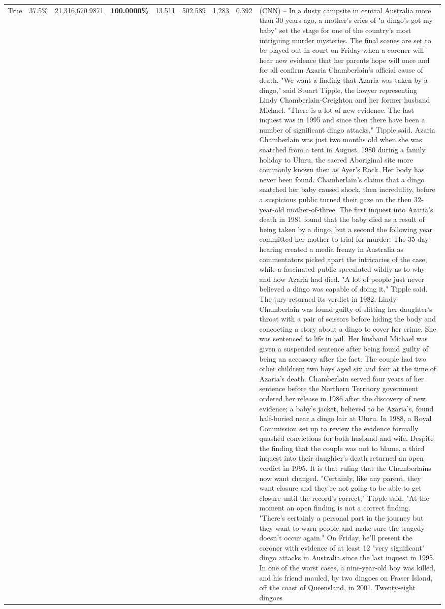 \begin{table}[H]
\begin{tabular}{lllrlllll}
True & 37.5\% & 21,316,670.9871 & \bfseries \color{red} 100.0000\% & 13.511 & 502.589 & 1,283 & 0.392 & (CNN) -- In a dusty campsite in central Australia more than 30 years ago, a mother's cries of "a dingo's got my baby" set the stage for one of the country's most intriguing murder mysteries. The final scenes are set to be played out in court on Friday when a coroner will hear new evidence that her parents hope will once and for all confirm Azaria Chamberlain's official cause of death. "We want a finding that Azaria was taken by a dingo," said Stuart Tipple, the lawyer representing Lindy Chamberlain-Creighton and her former husband Michael. "There is a lot of new evidence. The last inquest was in 1995 and since then there have been a number of significant dingo attacks," Tipple said. Azaria Chamberlain was just two months old when she was snatched from a tent in August, 1980 during a family holiday to Uluru, the sacred Aboriginal site more commonly known then as Ayer's Rock. Her body has never been found. Chamberlain's claims that a dingo snatched her baby caused shock, then incredulity, before a suspicious public turned their gaze on the then 32-year-old mother-of-three. The first inquest into Azaria's death in 1981 found that the baby died as a result of being taken by a dingo, but a second the following year committed her mother to trial for murder. The 35-day hearing created a media frenzy in Australia as commentators picked apart the intricacies of the case, while a fascinated public speculated wildly as to why and how Azaria had died. "A lot of people just never believed a dingo was capable of doing it," Tipple said. The jury returned its verdict in 1982; Lindy Chamberlain was found guilty of slitting her daughter's throat with a pair of scissors before hiding the body and concocting a story about a dingo to cover her crime. She was sentenced to life in jail. Her husband Michael was given a suspended sentence after being found guilty of being an accessory after the fact. The couple had two other children; two boys aged six and four at the time of Azaria's death. Chamberlain served four years of her sentence before the Northern Territory government ordered her release in 1986 after the discovery of new evidence; a baby's jacket, believed to be Azaria's, found half-buried near a dingo lair at Uluru. In 1988, a Royal Commission set up to review the evidence formally quashed convictions for both husband and wife. Despite the finding that the couple was not to blame, a third inquest into their daughter's death returned an open verdict in 1995. It is that ruling that the Chamberlains now want changed. "Certainly, like any parent, they want closure and they're not going to be able to get closure until the record's correct," Tipple said. "At the moment an open finding is not a correct finding. "There's certainly a personal part in the journey but they want to warn people and make sure the tragedy doesn't occur again." On Friday, he'll present the coroner with evidence of at least 12 "very significant" dingo attacks in Australia since the last inquest in 1995. In one of the worst cases, a nine-year-old boy was killed, and his friend mauled, by two dingoes on Fraser Island, off the coast of Queensland, in 2001. Twenty-eight dingoes 
\end{tabular}
\end{table}
